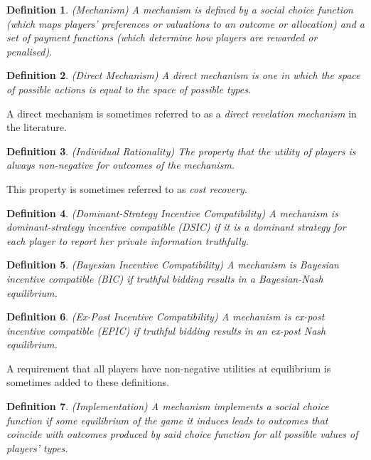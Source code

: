 \documentclass{article}
\newtheorem{definition}{Definition}
\begin{document}
\begin{definition}
(Mechanism) A mechanism is defined by a social choice function (which maps players' preferences or valuations to an outcome or allocation) and a set of payment functions (which determine how players are rewarded or penalised).
\end{definition}


\begin{definition}
(Direct Mechanism) A direct mechanism is one in which the space of possible actions is equal to the space of possible types.
\end{definition}

A direct mechanism is sometimes referred to as a \textit{direct revelation mechanism} in the literature.

\begin{definition}
(Individual Rationality) The property that the utility of players is always non-negative for outcomes of the mechanism.
\end{definition}

This property is sometimes referred to as \textit{cost recovery}.

\begin{definition}
(Dominant-Strategy Incentive Compatibility) A mechanism is dominant-strategy incentive compatible (DSIC) if it is a dominant strategy for each player to report her private information truthfully.
\end{definition}

\begin{definition}
(Bayesian Incentive Compatibility) A mechanism is Bayesian incentive compatible (BIC) if truthful bidding results in a Bayesian-Nash equilibrium.
\end{definition}

\begin{definition}
(Ex-Post Incentive Compatibility) A mechanism is ex-post incentive compatible (EPIC) if truthful bidding results in an ex-post Nash equilibrium.
\end{definition}

A requirement that all players have non-negative utilities at equilibrium is sometimes added to these definitions.

\begin{definition}
(Implementation) A mechanism implements a social choice function if some equilibrium of the game it induces leads to outcomes that coincide with outcomes produced by said choice function for all possible values of players' types.
\end{definition}
\end{document}
